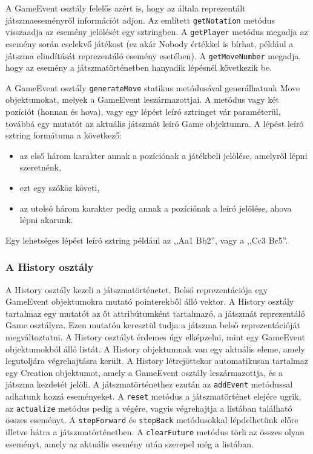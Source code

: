 \documentclass[12pt, twoside]{report}
\begin{document}
A GameEvent osztály felelős azért is, hogy az általa reprezentált játszmaeseményről információt adjon. Az említett {\tt getNotation} metódus visszaadja az esemény jelölését egy sztringben. A {\tt getPlayer} metódus megadja az esemény során cselekvő játékost (ez akár Nobody értékkel is bírhat, például a játszma elindítását reprezentáló esemény esetében). A {\tt getMoveNumber} megadja, hogy az esemény a játszmatörténetben hanyadik lépésnél következik be.

A GameEvent osztály {\tt generateMove} statikus metódusával generálhatunk Move objektumokat, melyek a GameEvent leszármazottjai. A metódus vagy két pozíciót (honnan és hova), vagy egy lépést leíró sztringet vár paraméterül, továbbá egy mutatót az aktuális játszmát leíró Game objektumra. A lépést leíró sztring formátuma a következő:
\begin{itemize}
	\item az első három karakter annak a pozíciónak a játékbeli jelölése, amelyről lépni szeretnénk,
	\item ezt egy szóköz követi,
	\item az utolsó három karakter pedig annak a pozíciónak a leíró jelölése, ahova lépni akarunk.
\end{itemize}
Egy lehetséges lépést leíró sztring például az ,,Aa1 Bb2'', vagy a ,,Cc3 Bc5''.

\subsubsection{A History osztály}

A History osztály kezeli a játszmatörténetet. Belső reprezentációja egy GameEvent objektumokra mutató pointerekből álló vektor. A History osztály tartalmaz egy mutatót az őt attribútumként tartalmazó, a játszmát reprezentáló Game osztályra. Ezen mutatón keresztül tudja a játszma belső reprezentációját megváltoztatni. A History osztályt érdemes úgy elképzelni, mint egy GameEvent objektumokból álló listát. A History objektumnak van egy aktuális eleme, amely legutoljára végrehajtásra került. A History létrejöttekor automatikusan tartalmaz egy Creation objektumot, amely a GameEvent osztály leszármazottja, és a játszma kezdetét jelöli. A játszmatörténethez ezután az {\tt addEvent} metódussal adhatunk hozzá eseményeket. A {\tt reset} metódus a játszmatörténet elejére ugrik, az {\tt actualize} metódus pedig a végére, vagyis végrehajtja a listában található összes eseményt. A {\tt stepForward} és {\tt stepBack} metódusokkal lépdelhetünk előre illetve hátra a játszmatörténetben. A {\tt clearFuture} metódus törli az összes olyan eseményt, amely az aktuális esemény után szerepel még a listában.
\end{document}
